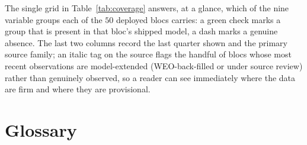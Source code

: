 \documentclass[11pt]{article}
\theoremstyle{plain}
\theoremstyle{remark}
\begin{document}
The single grid in Table~\ref{tab:coverage} answers, at a glance, which
of the nine variable groups each of the $50$ deployed blocs carries: a
green check marks a group that is present in that bloc's shipped model, a
dash marks a genuine absence. The last two columns record the last
quarter shown and the primary source family; an italic tag on the source
flags the handful of blocs whose most recent observations are
model-extended (WEO-back-filled or under source review) rather than
genuinely observed, so a reader can see immediately where the data are
firm and where they are provisional.





\section{Glossary}\label{app:glossary}
\end{document}
